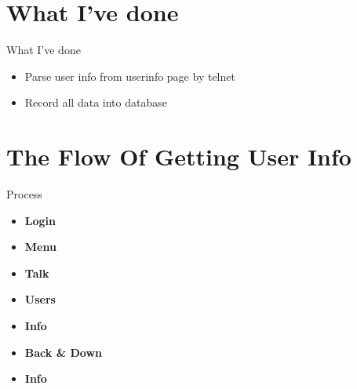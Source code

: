 \documentclass{beamer}
\begin{document}
\section{What I've done}
\begin{frame}{What I've done}
    \begin{itemize}
        \item {Parse user info from userinfo page by telnet}
        \item {Record all data into database}
    \end{itemize}
\end{frame}

\section{The Flow Of Getting User Info}

\begin{frame} {Process}
    \begin{itemize}
        \item \textbf{Login}
        \item \textbf{Menu} 
        \item \textbf{Talk}
        \item \textbf{Users}
        \item \textbf{Info}
        \item \textbf{Back \& Down}
        \item \textbf{Info}
    \end{itemize}
\end{frame}
\end{document}
